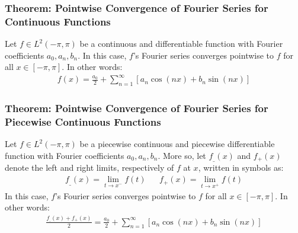 \documentclass[11pt, a4paper]{article}
\begin{document}
\subsubsection{Theorem: Pointwise Convergence of Fourier Series for Continuous Functions}
Let $ f \in L^2(-\pi, \pi) $ be a continuous and differentiable function with Fourier coefficients $ a_0, a_n, b_n $. 
In this case, $ f $'s Fourier series converges pointwise to $ f $ for all $ x \in [-\pi, \pi] $. In other words:
\begin{align*}
	f(x) = \frac{a_0}{2} + \sum_{n = 1}^{\infty} \left[a_n \cos(nx) + b_n \sin(nx) \right]
\end{align*}

\subsubsection{Theorem: Pointwise Convergence of Fourier Series for Piecewise Continuous Functions}
Let $ f \in L^2(-\pi, \pi) $ be a piecewise continuous and piecewise differentiable function with Fourier coefficients $ a_0, a_n, b_n $. More so, let $f_{\_}(x) $ and $ f_{+}(x) $ denote the left and right limits, respectively of $ f $ at $ x $, written in symbols as:
\begin{align*}
	f_{\_}(x) = \lim_{t \to x^{-}} f(t) && f_{+}(x) = \lim_{t \to x^{+}} f(t)
\end{align*}
In this case, $ f $'s Fourier series converges pointwise to $ f $ for all $ x \in [-\pi, \pi] $. In other words:
\begin{align*}
	\frac{f_{\_}(x) + f_{+}(x)}{2} = \frac{a_0}{2} + \sum_{n = 1}^{\infty} \left[a_n \cos(nx) + b_n \sin(nx) \right]
\end{align*}
\end{document}
